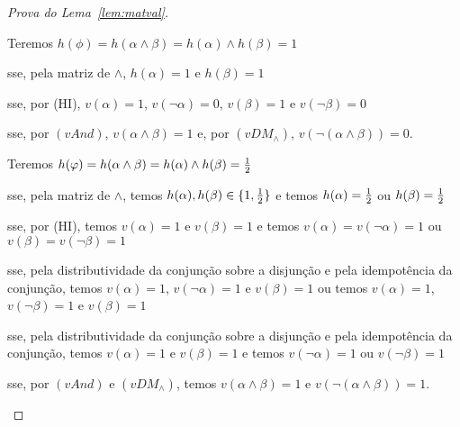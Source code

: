 \begin{proof}[Prova do Lema~\ref{lem:matval}]
\begin{provaporcasos}

            \begin{provaporsubcasos}

                    Teremos $h(\phi) = h(\alpha \land \beta) = h(\alpha) \land h(\beta) = 1$

                    \qquad{}sse, pela matriz de $\land$, $h(\alpha) = 1$ e $h(\beta) = 1$

                    \qquad{}sse, por (HI), $v(\alpha) = 1$, $v(\neg \alpha) = 0$, $v(\beta) = 1$ e $v(\neg \beta) = 0$

                    \qquad{}sse, por $(vAnd)$, $v(\alpha \land \beta) = 1$ e, por $(vDM_{\land})$, $v(\neg(\alpha \land \beta)) = 0$.
            

                    Teremos $h(\varphi) = h(\alpha \land \beta) = h(\alpha) \land h(\beta) = \frac{1}{2}{}$

                    \qquad{}sse, pela matriz de $\land$, temos $h(\alpha), h(\beta) \in \{1, \frac{1}{2}{}\}$ e temos $h(\alpha) = \frac{1}{2}{}$ ou $h(\beta) = \frac{1}{2}{}$
                    
                    \qquad{}sse, por (HI), temos $v(\alpha) = 1$ e $v(\beta) = 1$ e temos $v(\alpha) = v(\neg \alpha) = 1$ ou $v(\beta) = v(\neg \beta) = 1$

                    \qquad{}sse, pela distributividade da conjunção sobre a disjunção e pela idempotência da conjunção, temos $v(\alpha) = 1$, $v(\neg \alpha) = 1$ e $v(\beta) = 1$ ou temos $v(\alpha) = 1$, $v(\neg \beta) = 1$ e $v(\beta) = 1$

                    \qquad{}sse, pela distributividade da conjunção sobre a disjunção e pela idempotência da conjunção, temos $v(\alpha) = 1$ e $v(\beta) = 1$ e temos $v(\neg \alpha) = 1$ ou $v(\neg \beta) = 1$

                    \qquad{}sse, por $(vAnd)$ e $(vDM_{\land})$, temos $v(\alpha \land \beta) = 1$ e $v(\neg (\alpha \land \beta)) = 1$.



\end{provaporsubcasos}
\end{provaporcasos}
\end{proof}
